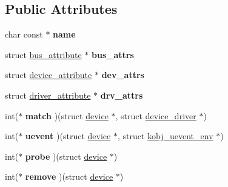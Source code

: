 \subsection*{Public Attributes}
\begin{DoxyCompactItemize}
\item 
\hypertarget{structbus__type_a8e02b770017ad35b958a1e37ea8b5d07}{}char const $\ast$ {\bfseries name}\label{structbus__type_a8e02b770017ad35b958a1e37ea8b5d07}

\item 
\hypertarget{structbus__type_a4618ef7c5c9a126bd17469066b568dbf}{}struct \hyperlink{structbus__attribute}{bus\+\_\+attribute} $\ast$ {\bfseries bus\+\_\+attrs}\label{structbus__type_a4618ef7c5c9a126bd17469066b568dbf}

\item 
\hypertarget{structbus__type_a75091487b6c9f9db9719fc2685e10bc5}{}struct \hyperlink{structdevice__attribute}{device\+\_\+attribute} $\ast$ {\bfseries dev\+\_\+attrs}\label{structbus__type_a75091487b6c9f9db9719fc2685e10bc5}

\item 
\hypertarget{structbus__type_acddbc04a58624f33a90566102dcd7de5}{}struct \hyperlink{structdriver__attribute}{driver\+\_\+attribute} $\ast$ {\bfseries drv\+\_\+attrs}\label{structbus__type_acddbc04a58624f33a90566102dcd7de5}

\item 
\hypertarget{structbus__type_a46fe4c1f28714a06fa0073af7e3c6258}{}int($\ast$ {\bfseries match} )(struct \hyperlink{structdevice}{device} $\ast$, struct \hyperlink{structdevice__driver}{device\+\_\+driver} $\ast$)\label{structbus__type_a46fe4c1f28714a06fa0073af7e3c6258}

\item 
\hypertarget{structbus__type_aec7aebd8831e1ae2dc58bc0e88c8eeda}{}int($\ast$ {\bfseries uevent} )(struct \hyperlink{structdevice}{device} $\ast$, struct \hyperlink{structkobj__uevent__env}{kobj\+\_\+uevent\+\_\+env} $\ast$)\label{structbus__type_aec7aebd8831e1ae2dc58bc0e88c8eeda}

\item 
\hypertarget{structbus__type_ad153654adcb2ab7eca4cfb8f1dd61d7a}{}int($\ast$ {\bfseries probe} )(struct \hyperlink{structdevice}{device} $\ast$)\label{structbus__type_ad153654adcb2ab7eca4cfb8f1dd61d7a}

\item 
\hypertarget{structbus__type_a57b64c5e15343983e371aa6075f0d5c6}{}int($\ast$ {\bfseries remove} )(struct \hyperlink{structdevice}{device} $\ast$)\label{structbus__type_a57b64c5e15343983e371aa6075f0d5c6}


\end{DoxyCompactItemize}

